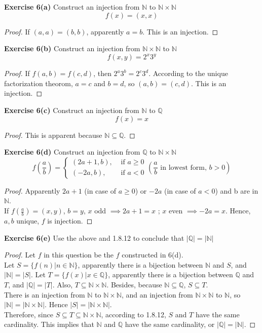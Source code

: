 \documentclass[12pt]{article}
\newcommand{\bbN}{\mathbb{N}}
\newcommand{\bbQ}{\mathbb{Q}}
\theoremstyle{definition}
\numberwithin{equation}{subsection}
\begin{document}
\textbf{Exercise 6(a)} Construct an injection from \(\mathbb{N}\) to \(\mathbb{N} \times \mathbb{N}\)
$$
f(x) = (x,x)
$$
\begin{proof}
If $(a,a)=(b,b)$, apparently $a=b$. This is an injection.

\end{proof}

\textbf{Exercise 6(b)} Construct an injection from \(\mathbb{N} \times \mathbb{N}\) to \(\mathbb{N}\)
$$
f(x,y)=2^x3^y
$$
\begin{proof}
If $f(a,b) = f(c, d)$, then $2^a3^b = 2^c3^d$. According to the unique factorization theorom, $a = c$ and $b =d$, so $(a,b)=(c,d)$. This is an injection.
\end{proof}

\textbf{Exercise 6(c)} Construct an injection from \(\mathbb{N}\) to \(\mathbb{Q} \)
$$
f(x)=x
$$
\begin{proof}
This is apparent because $\bbN \subseteq\bbQ$.
\end{proof}

\textbf{Exercise 6(d)} Construct an injection from \(\mathbb{Q}\) to \(\mathbb{N} \times \mathbb{N}\)
$$
f(\frac{a}{b})=\left\{\begin{array}{ll}{(2a+1,b),} & {\text { if } a \geq0} \\ {(-2a, b),} & {\text { if } a <0}\end{array}\right.( \frac{a}{b} \text{ in lowest form, }b>0)
$$
\begin{proof}
Apparently $2a+1$ (in case of $a\geq 0$) or $-2a$ (in case of $a<0$) and b are in $\bbN$.\\
If $f(\frac{a}{b})=(x,y)$, $b=y$, $x$ odd $\implies 2a+1=x$ ; $x$ even $\implies -2a=x$. Hence, $a,b$ unique, $f$ is injection.
\end{proof}

\textbf{Exercise 6(e)} Use the above and 1.8.12 to conclude that $|\bbQ| = |\bbN|$
\begin{proof}
Let $f$ in this question be the $f$ constructed in 6(d).\\
Let $S=\{f(n)|n\in \bbN\}$, apparently there is a bijection between $\bbN$ and $S$, and $|\bbN|=|S|$.
Let $T=\{f(x)|x\in\bbQ\}$, apparently there is a bijection between $\bbQ$ and $T$, and $|\bbQ|=|T|$. Also, $T \subseteq \bbN \times\bbN$.
Besides, because $\bbN \subseteq \bbQ$, $S \subseteq T$.
\\
There is an injection from $\bbN$ to $\bbN \times \bbN$, and an injection from $\bbN \times \bbN$ to $\bbN$, so $|\bbN|=|\bbN \times \bbN|$. Hence $|S|=|\bbN \times \bbN|$.
\\
Therefore, since $S \subseteq T \subseteq \bbN \times \bbN$, according to 1.8.12, $S$ and $T$ have the same cardinality. This implies that $\bbN$ and $\bbQ$ have the same cardinality, or $|\bbQ| = |\bbN|$.
\end{proof}
\end{document}

